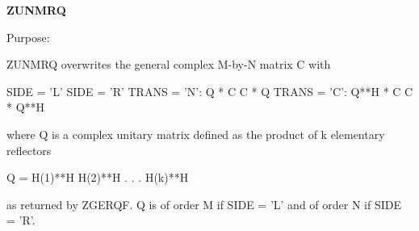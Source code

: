 {\bfseries Z\+U\+N\+M\+R\+Q} 

 \begin{DoxyParagraph}{Purpose\+: }
\begin{DoxyVerb} ZUNMRQ overwrites the general complex M-by-N matrix C with

                 SIDE = 'L'     SIDE = 'R'
 TRANS = 'N':      Q * C          C * Q
 TRANS = 'C':      Q**H * C       C * Q**H

 where Q is a complex unitary matrix defined as the product of k
 elementary reflectors

       Q = H(1)**H H(2)**H . . . H(k)**H

 as returned by ZGERQF. Q is of order M if SIDE = 'L' and of order N
 if SIDE = 'R'.\end{DoxyVerb}
 
\end{DoxyParagraph}

